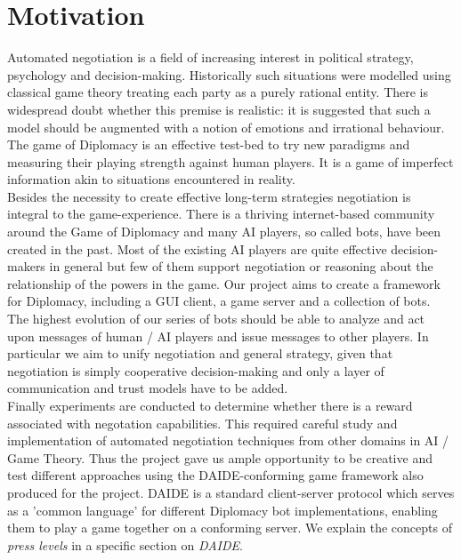 \documentclass[pdftex,12pt,a4paper]{report}
\begin{document}

\section{Motivation}

Automated negotiation is a field of increasing interest in political
strategy, psychology and decision-making. Historically
such situations were modelled using classical game theory treating
each party as a purely rational entity. There is widespread doubt
whether this premise is realistic: it is suggested that such a model
should be augmented with a notion of emotions and irrational behaviour. \\

The game of Diplomacy is an effective test-bed to try new  
paradigms and measuring their playing strength against 
human players. It is a game of imperfect information akin
to situations encountered in reality. \\

Besides the necessity to create effective long-term strategies
negotiation is integral to the game-experience.  There is a thriving
internet-based community around the Game of Diplomacy and many AI
players, so called bots, have been created in the past. Most of the
existing AI players are quite effective decision-makers in general but
few of them support negotiation or reasoning about the relationship of
the powers in the game. Our project aims to create a framework for
Diplomacy, including a GUI client, a game server and a collection of
bots. The highest evolution of our series of bots should be able to
analyze and act upon messages of human / AI players and issue messages
to other players. In particular we aim to unify negotiation and
general strategy, given that negotiation is simply 
cooperative decision-making and only a layer of communication and
trust models have to be added. \\

Finally experiments are conducted to determine whether there is a
reward associated with negotation capabilities. This required careful
study and implementation of automated negotiation techniques from
other domains in AI / Game Theory. Thus the project gave us ample
opportunity to be creative and test different approaches using the
DAIDE-conforming game framework also produced for the project. DAIDE
is a standard client-server protocol \cite{DaideWeb} which serves as a
'common language' for different Diplomacy bot implementations,
enabling them to play a game together on a conforming server. We
explain the concepts of \textit{press levels} in a specific section on
\textit{DAIDE}.
\end{document}
